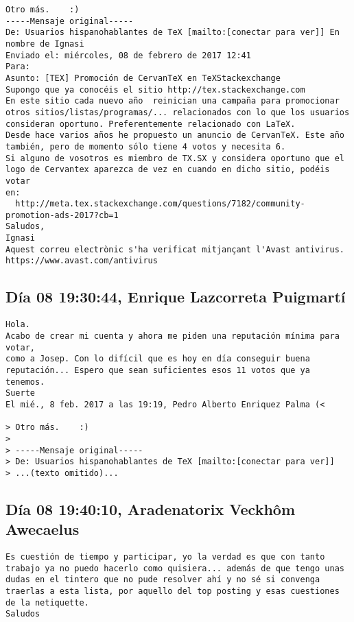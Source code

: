 \documentclass[a4paper,10pt]{article}
\begin{document}
\begin{lstlisting}
Otro más.    :) 
-----Mensaje original----- 
De: Usuarios hispanohablantes de TeX [mailto:[conectar para ver]] En nombre de Ignasi 
Enviado el: miércoles, 08 de febrero de 2017 12:41 
Para: 
Asunto: [TEX] Promoción de CervanTeX en TeXStackexchange 
Supongo que ya conocéis el sitio http://tex.stackexchange.com
En este sitio cada nuevo año  reinician una campaña para promocionar otros sitios/listas/programas/... relacionados con lo que los usuarios consideran oportuno. Preferentemente relacionado con LaTeX. 
Desde hace varios años he propuesto un anuncio de CervanTeX. Este año también, pero de momento sólo tiene 4 votos y necesita 6. 
Si alguno de vosotros es miembro de TX.SX y considera oportuno que el logo de Cervantex aparezca de vez en cuando en dicho sitio, podéis votar 
en: 
  http://meta.tex.stackexchange.com/questions/7182/community-promotion-ads-2017?cb=1
Saludos, 
Ignasi 
Aquest correu electrònic s'ha verificat mitjançant l'Avast antivirus. 
https://www.avast.com/antivirus

\end{lstlisting}

\subsection{Día 08 19:30:44, Enrique Lazcorreta Puigmartí}

\begin{lstlisting}
Hola.
Acabo de crear mi cuenta y ahora me piden una reputación mínima para votar,
como a Josep. Con lo difícil que es hoy en día conseguir buena
reputación... Espero que sean suficientes esos 11 votos que ya tenemos.
Suerte
El mié., 8 feb. 2017 a las 19:19, Pedro Alberto Enriquez Palma (<

> Otro más.    :)
>
> -----Mensaje original-----
> De: Usuarios hispanohablantes de TeX [mailto:[conectar para ver]]
> ...(texto omitido)...

\end{lstlisting}

\subsection{Día 08 19:40:10, Aradenatorix Veckhôm Awecaelus}

\begin{lstlisting}
Es cuestión de tiempo y participar, yo la verdad es que con tanto
trabajo ya no puedo hacerlo como quisiera... además de que tengo unas
dudas en el tintero que no pude resolver ahí y no sé si convenga
traerlas a esta lista, por aquello del top posting y esas cuestiones
de la netiquette.
Saludos

\end{lstlisting}
\end{document}
